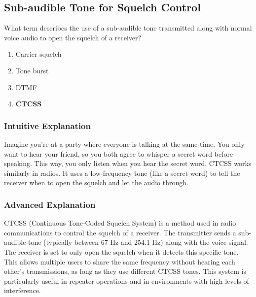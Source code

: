 \subsection{Sub-audible Tone for Squelch Control}
\label{T2B02}

\begin{tcolorbox}[colback=gray!10!white,colframe=black!75!black,title=T2B02]
What term describes the use of a sub-audible tone transmitted along with normal voice audio to open the squelch of a receiver?
\begin{enumerate}[noitemsep]
    \item Carrier squelch
    \item Tone burst
    \item DTMF
    \item \textbf{CTCSS}
\end{enumerate}
\end{tcolorbox}

\subsubsection*{Intuitive Explanation}
Imagine you're at a party where everyone is talking at the same time. You only want to hear your friend, so you both agree to whisper a secret word before speaking. This way, you only listen when you hear the secret word. CTCSS works similarly in radios. It uses a low-frequency tone (like a secret word) to tell the receiver when to open the squelch and let the audio through.

\subsubsection*{Advanced Explanation}
CTCSS (Continuous Tone-Coded Squelch System) is a method used in radio communications to control the squelch of a receiver. The transmitter sends a sub-audible tone (typically between 67 Hz and 254.1 Hz) along with the voice signal. The receiver is set to only open the squelch when it detects this specific tone. This allows multiple users to share the same frequency without hearing each other's transmissions, as long as they use different CTCSS tones. This system is particularly useful in repeater operations and in environments with high levels of interference.